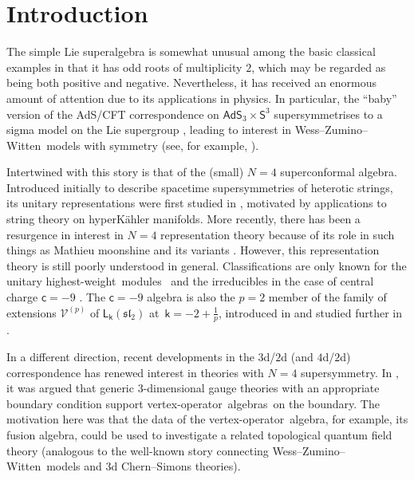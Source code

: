 \documentclass[pdftex]{sigma}
\numberwithin{equation}{section}
\newcommand{\cc}{\mathsf{c}} %
\newcommand{\kk}{\mathsf{k}} %
\newcommand{\alg}[1]{\mathfrak{#1}} %
\newcommand{\grp}[1]{\mathsf{#1}} %
\newcommand{\VOA}[1]{\mathsf{#1}} %
\newcommand{\affine}[1]{\widehat{#1}}
\newcommand{\SLA}[2]{\alg{#1}_{#2}} %
\newcommand{\SLSA}[3]{\alg{#1}_{#2 \vert #3}} %
\newcommand{\AKMSA}[3]{\affine{\alg{#1}}_{#2 \vert #3}} %
\newcommand{\sltwo}{\SLA{sl}{2}}
\newcommand{\psl}{\SLSA{psl}{2}{2}}
\newcommand{\apsl}{\AKMSA{psl}{2}{2}}
\newcommand{\saff}[2]{\VOA{L}_{#1}(#2)} %
\newcommand{\ssl}[1][\kk]{\saff{#1}{\sltwo}} %
\newcommand{\wzw}{Wess--Zumino--Witten}
\newcommand{\hw}{highest-weight}
\newcommand{\hwm}{\hw\ module}
\newcommand{\hwms}{\hwm s}
\newcommand{\vo}{vertex-operator}
\newcommand{\voa}{\vo\ algebra}
\newcommand{\voas}{\voa s}
\begin{document}
\section{Introduction}

The simple Lie superalgebra \smash{$\psl$} is somewhat unusual among the basic classical examples in that it has odd roots of multiplicity $2$, which may be regarded as being both positive and negative.
Nevertheless, it has received an enormous amount of attention due to its applications in physics.
In particular, the ``baby'' version of the AdS/CFT correspondence on $\grp{AdS}_3 \times \grp{S}^3$ supersymmetrises to a sigma model on the Lie supergroup \smash{$\grp{PSU}_{1,1\vert2}$} \cite{BerCon99}, leading to interest in \wzw\ models with \smash{$\apsl$} symmetry (see, for example, \cite{EbeWor18,FerL1p24,GabMas11,GabU2223,GotWZN06,TroMas11}).

Intertwined with this story is that of the (small) $N=4$ superconformal algebra.
Introduced initially to describe spacetime supersymmetries of heterotic strings, its unitary representations were first studied in \cite{EguUni87}, motivated by applications to string theory on hyperK\"{a}hler manifolds.
More recently, there has been a resurgence in interest in $N=4$ representation theory because of its role in such things as Mathieu moonshine and its variants \cite{EguNot10}.
However, this representation theory is still poorly understood in general.
Classifications are only known for the unitary \hwms\ \cite{KacUni22,KacSpe25} and the irreducibles in the case of central charge $\cc=-9$ \cite{AdaRea14}.
The $\cc= -9$ algebra is also the $p=2$ member of the family of extensions $\mathcal{V}^{(p)}$ of $\ssl$ at~${\kk=-2+\frac{1}{p}}$, introduced in \cite{AdaRea14} and studied further in \cite{AdaVer20}.

In a different direction, recent developments in the $3$d/$2$d (and $4$d/$2$d) correspondence has renewed interest in theories with $N=4$ supersymmetry.
In \cite{CosVer18}, it was argued that generic $3$-dimensional gauge theories with an appropriate boundary condition support \voas\ on the boundary.
The motivation here was that the data of the \voa, for example, its fusion algebra, could be used to investigate a related topological quantum field theory (analogous to the well-known story connecting \wzw\ models and $3$d Chern--Simons theories).
\end{document}
